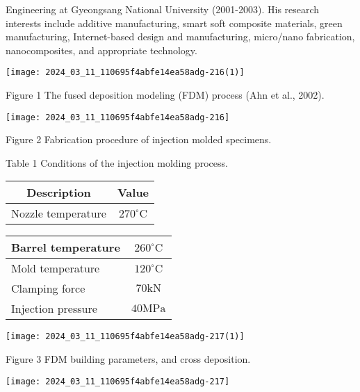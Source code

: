 \documentclass[10pt]{article}
\begin{document}
Engineering at Gyeongsang National University (2001-2003). His research interests include additive manufacturing, smart soft composite materials, green manufacturing, Internet-based design and manufacturing, micro/nano fabrication, nanocomposites, and appropriate technology.

\begin{center}
\texttt{[image: 2024\_03\_11\_110695f4abfe14ea58adg-216(1)]}
\end{center}

Figure 1 The fused deposition modeling (FDM) process (Ahn et al., 2002).

\begin{center}
\texttt{[image: 2024\_03\_11\_110695f4abfe14ea58adg-216]}
\end{center}

Figure 2 Fabrication procedure of injection molded specimens.

Table 1 Conditions of the injection molding process.

\begin{center}
\begin{tabular}{cc}
\hline
Description & Value \\
\hline
Nozzle temperature & $270^{\circ} \mathrm{C}$ \\
\hline
\end{tabular}
\end{center}

\begin{center}
\begin{tabular}{lc}
\hline
Barrel temperature & $260^{\circ} \mathrm{C}$ \\
\hline
Mold temperature & $120^{\circ} \mathrm{C}$ \\
\hline
Clamping force & $70 \mathrm{kN}$ \\
\hline
Injection pressure & $40 \mathrm{MPa}$ \\
\hline
\end{tabular}
\end{center}

\begin{center}
\texttt{[image: 2024\_03\_11\_110695f4abfe14ea58adg-217(1)]}
\end{center}

Figure 3 FDM building parameters, and cross deposition.

\begin{center}
\texttt{[image: 2024\_03\_11\_110695f4abfe14ea58adg-217]}
\end{center}
\end{document}
